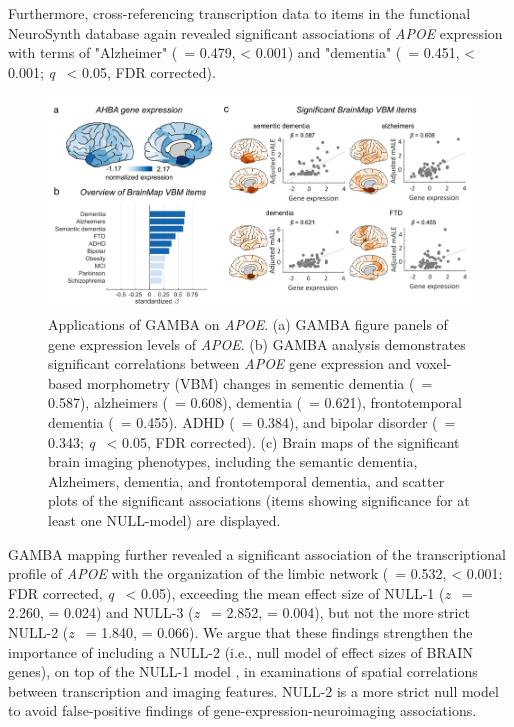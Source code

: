 \begin{refsection}
Furthermore, cross-referencing transcription data to items in the functional NeuroSynth database again revealed significant associations of \textit{APOE} expression with terms of "Alzheimer" (\textbeta \ = 0.479, \pval < 0.001) and "dementia" (\textbeta \ = 0.451, \pval < 0.001; \textit{q} \ < 0.05, FDR corrected). 

\begin{figure}[h]
    \centering
    \includegraphics[width=\linewidth]{images/gambaFig3.png}
    \caption{Applications of GAMBA on \textit{APOE}. (a) GAMBA figure panels of gene expression levels of \textit{APOE}. (b) GAMBA analysis demonstrates significant correlations between \textit{APOE} gene expression and voxel-based morphometry (VBM) changes in sementic dementia (\textbeta \ = 0.587), alzheimers (\textbeta \ = 0.608), dementia (\textbeta \ = 0.621), frontotemporal dementia (\textbeta \ = 0.455). ADHD (\textbeta \ = 0.384), and bipolar disorder (\textbeta \ = 0.343; \textit{q} \ < 0.05, FDR corrected). (c) Brain maps of the significant brain imaging phenotypes, including the semantic dementia, Alzheimers, dementia, and frontotemporal dementia, and scatter plots of the significant associations (items showing significance for at least one NULL-model) are displayed.}
    \label{gambaFig3}
\end{figure}

GAMBA mapping further revealed a significant association of the transcriptional profile of \textit{APOE} with the organization of the limbic network (\textbeta \ = 0.532, \pval < 0.001; FDR corrected, \textit{q} \ < 0.05), exceeding the mean effect size of NULL-1 (\textit{z} \ = 2.260, \pval =  0.024) and NULL-3 (\textit{z} \ = 2.852, \pval =  0.004), but not the more strict NULL-2 (\textit{z} \ = 1.840, \pval =  0.066). We argue that these findings strengthen the importance of including a NULL-2 (i.e., null model of effect sizes of BRAIN genes), on top of the NULL-1 model \citep{romero2019synaptic,Romme2017ConnectomeDA}, in examinations of spatial correlations between transcription and imaging features. NULL-2 \citep{anderson2020convergent,Wei2019GeneticMA} is a more strict null model to avoid false-positive findings of gene-expression-neuroimaging associations. 


\end{refsection}
